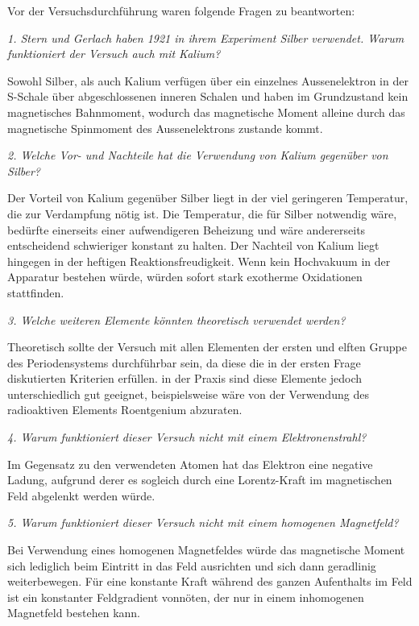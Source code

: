 \documentclass[a4paper,parskip,11pt, DIV12]{scrreprt}
\begin{document}
 Vor der Versuchsdurchführung waren folgende Fragen zu beantworten:
 
 \textit{1. Stern und Gerlach haben 1921 in ihrem Experiment Silber verwendet. Warum funktioniert der
Versuch auch mit Kalium?}

Sowohl Silber, als auch Kalium verfügen über ein einzelnes Aussenelektron in der S-Schale über abgeschlossenen inneren Schalen und haben im Grundzustand kein magnetisches Bahnmoment, wodurch das magnetische Moment alleine durch das magnetische Spinmoment des Aussenelektrons zustande kommt.

\textit{2. Welche Vor- und Nachteile hat die Verwendung von Kalium gegenüber von Silber?}

Der Vorteil von Kalium gegenüber Silber liegt in der viel geringeren Temperatur, die zur Verdampfung nötig ist. Die Temperatur, die für Silber notwendig wäre, bedürfte einerseits einer aufwendigeren Beheizung und wäre andererseits entscheidend schwieriger konstant zu halten. Der Nachteil von Kalium liegt hingegen in der heftigen Reaktionsfreudigkeit. Wenn kein Hochvakuum in der Apparatur bestehen würde, würden sofort stark exotherme Oxidationen stattfinden.

\textit{3. Welche weiteren Elemente könnten theoretisch verwendet werden?}

Theoretisch sollte der Versuch mit allen Elementen der ersten und elften Gruppe des Periodensystems durchführbar sein, da diese die in der ersten Frage diskutierten Kriterien erfüllen. in der Praxis sind diese Elemente jedoch unterschiedlich gut geeignet, beispielsweise wäre von der Verwendung des radioaktiven Elements Roentgenium abzuraten.

\textit{4. Warum funktioniert dieser Versuch nicht mit einem Elektronenstrahl?}

Im Gegensatz zu den verwendeten Atomen hat das Elektron eine negative Ladung, aufgrund derer es sogleich durch eine Lorentz-Kraft im magnetischen Feld abgelenkt werden würde.

\textit{5. Warum funktioniert dieser Versuch nicht mit einem homogenen Magnetfeld?}

Bei Verwendung eines homogenen Magnetfeldes würde das magnetische Moment sich lediglich beim Eintritt in das Feld ausrichten und sich dann geradlinig weiterbewegen. Für eine konstante Kraft während des ganzen Aufenthalts im Feld ist ein konstanter Feldgradient vonnöten, der nur in einem inhomogenen Magnetfeld bestehen kann.
\end{document}
